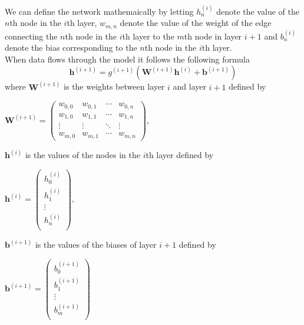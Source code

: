 \documentclass[main.tex]{subfiles}
\begin{document}
We can define the network mathemaically by letting $h_n ^{(i)}$ denote the value of the $n$th node in the $i$th layer, $w_{m, n}$ denote the value of the weight of the edge connecting the $n$th node in the $i$th layer to the $m$th node in layer $i + 1$ and $b_n ^{(i)}$ denote the bias corresponding to the $n$th node in the $i$th layer. \\
When data flows through the model it follows the following formula
$$\bm{h}^{(i + 1)} = g^{(i + 1)} \left( \bm{W}^{(i + 1)} \bm{h}^{(i)} + \bm{b}^{(i + 1)} \right)$$
where $\bm{W}^{(i + 1)}$ is the weights between layer $i$ and layer $i + 1$ defined by
\begin{center}
    \begin{math}
        \bm{W}^{(i + 1)} =
        \begin{pmatrix}
            w_{0, 0} & w_{0, 1} & \cdots & w_{0, n} \\
            w_{1, 0} & w_{1, 1} & \cdots & w_{1, n} \\
            \vdots & \vdots & \ddots & \vdots \\
            w_{m, 0} & w_{m, 1} & \cdots & w_{m, n}
        \end{pmatrix}
        ,
    \end{math}
\end{center}
$\bm{h}^{(i)}$ is the values of the nodes in the $i$th layer defined by
\begin{center}
    \begin{math}
        \bm{h}^{(i)} =
        \begin{pmatrix}
            h_{0} ^{(i)} \\
            h_{1} ^{(i)} \\
            \vdots \\
            h_{n} ^{(i)} \\
        \end{pmatrix}
        ,
    \end{math}
\end{center}
$\bm{b}^{(i + 1)}$ is the values of the biases of layer $i + 1$ defined by
\begin{center}
    \begin{math}
        \bm{b}^{(i + 1)} =
        \begin{pmatrix}
            b_{0} ^{(i + 1)} \\
            b_{1} ^{(i + 1)} \\
            \vdots \\
            b_{m} ^{(i + 1)} \\
        \end{pmatrix}
    \end{math}
\end{center}
\end{document}
